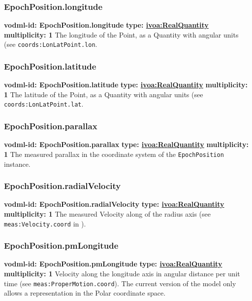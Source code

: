     \subsubsection{EpochPosition.longitude}
      \textbf{vodml-id: EpochPosition.longitude} \newline
      \textbf{type: \hyperref[sect:ivoa]{ivoa:RealQuantity}} \newline
      \textbf{multiplicity: 1} \newline
      The longitude of the Point, as a Quantity with angular units (see \texttt{coords:LonLatPoint.lon}.

    \subsubsection{EpochPosition.latitude}
      \textbf{vodml-id: EpochPosition.latitude} \newline
      \textbf{type: \hyperref[sect:ivoa]{ivoa:RealQuantity}} \newline
      \textbf{multiplicity: 1} \newline
      The latitude of the Point, as a Quantity with angular units (see \texttt{coords:LonLatPoint.lat}.

    \subsubsection{EpochPosition.parallax}
      \textbf{vodml-id: EpochPosition.parallax} \newline
      \textbf{type: \hyperref[sect:ivoa]{ivoa:RealQuantity}} \newline
      \textbf{multiplicity: 1} \newline
      The measured parallax in the coordinate system of the \texttt{EpochPosition} instance.

    \subsubsection{EpochPosition.radialVelocity}
      \textbf{vodml-id: EpochPosition.radialVelocity} \newline
      \textbf{type: \hyperref[sect:ivoa]{ivoa:RealQuantity}} \newline
      \textbf{multiplicity: 1} \newline
      The measured Velocity along of the radius axis (see \texttt{meas:Velocity.coord} in \cite{2022ivoa.spec.1004R}).

    \subsubsection{EpochPosition.pmLongitude}
      \textbf{vodml-id: EpochPosition.pmLongitude} \newline
      \textbf{type: \hyperref[sect:ivoa]{ivoa:RealQuantity}} \newline
      \textbf{multiplicity: 1} \newline
      Velocity along the longitude axis in angular distance per unit time (see \texttt{meas:ProperMotion.coord}). The current version of the model only allows a representation in the Polar coordinate space.

